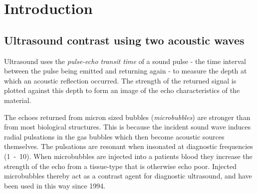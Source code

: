 



\chapter{Introduction}\label{ch:introduction}
\section{Ultrasound contrast using two acoustic waves}\label{sec:int:Introduction}

 

 

Ultrasound uses the {\em pulse-echo transit time} of a sound pulse -
the time interval between the pulse being emitted and returning again -
to measure the depth at which an acoustic reflection occurred.
The strength of the returned signal is plotted
against this depth to form an image of the echo characteristics of the material.



The echoes returned from micron sized bubbles ({\em microbubbles}) are stronger than from most biological structures.
This is because the incident sound wave induces radial pulsations in the gas bubbles
which then become acoustic sources themselves.
The pulsations are resonant when insonated at diagnostic frequencies (\unit{1-10}\mega\hertz).
When microbubbles are injected into a patients blood
they increase the strength of the echo
from a tissue-type that is otherwise echo poor.
Injected microbubbles thereby act as a contrast agent for diagnostic ultrasound,
and have been used in this way since 1994\cite{NYtimesAlbunex}.


